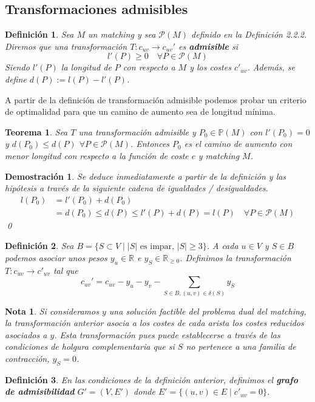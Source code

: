 \documentclass[twoside,a4paper,openright,12pt,tikz]{book}
\newtheorem{defi}{Definici\'on}[section]
\newtheorem{nota}{Nota}[section]
\newtheorem{thm}{Teorema}[section]
\newtheorem*{dem}{Demostración}
\newcommand{\R}{\mathbb{R}}
\begin{document}
\subsection{Transformaciones admisibles}
\begin{defi}
Sea $M$ un matching y sea $\mathcal{P}(M)$ definido en la Definición 2.2.2. Diremos que una transformación $T:c_{uv}\to c_{uv}'$  es \textbf{admisible} si
$$
l'(P)\geq 0\quad \forall P \in \mathcal{P}(M)
$$
Siendo $l'(P)$ la longitud de $P$ con respecto a $M$ y los costes $c'_{uv}$. Además, se define $d(P):= l(P)-l'(P)$.
\end{defi}
A partir de la definición de transformación admisible podemos probar un criterio de optimalidad para que un camino de aumento sea de longitud mínima.
\begin{thm}
Sea $T$ una transformación admisible y $P_0 \in \mathbb{P}(M)$ con $l'(P_0) =0$ y 	$d(P_0)\leq d(P)$ $\forall P \in \mathcal{P}(M)$. Entonces $P_0$ es el camino de aumento con menor longitud con respecto a la función de coste $c$ y matching $M$.
\end{thm}
\begin{dem}
Se deduce inmediatamente a partir de la definición y las hipótesis a través de la siguiente cadena de igualdades / desigualdades.
\begin{align*}
l(P_0) &= l'(P_0) + d(P_0)\\
&=d(P_0)\leq d(P) \leq l'(P) + d(P) = l(P)  \quad \forall P \in \mathcal{P}(M)
\end{align*}
\qed
\end{dem}
\begin{defi}
Sea $B=\{S\subset V \mid |S| \text{ es impar, }|S|\geq 3\}$. A cada $u\in V$ y $S\in B$ podemos asociar unos pesos $y_u \in \R$ e $y_S \in \R_{\geq 0}$. Definimos la transformación $T:c_{uv}\to c'_{uv}$ tal que
$$
c_{uv}' =c_{uv}-y_u-y_v - \sum_{S\in B, (u,v)\in \delta(S)}y_S
$$
\end{defi}
\begin{nota}
Si consideramos $y$ una solución factible del problema dual del matching, la transformación anterior asocia a los costes de cada arista los costes reducidos asociados a $y$. Esta transformación pues puede establecerse a través de las condiciones de holgura complementaria que si $S$ no pertenece a una familia de contracción, $y_S =0$.
\end{nota}
\begin{defi}
En las condiciones de la definición anterior, definimos el \textbf{grafo de admisibilidad} $G' = (V,E')$ donde $E' = \{(u,v)\in E\mid c'_{uv}=0\}$.
\end{defi}
\end{document}
